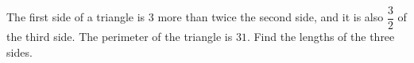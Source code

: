The first side of a triangle is $3$ more than twice the second side, and it is also $\dfrac{3}{2}$ of the third side. The perimeter of the triangle is $31$. Find the lengths of the three sides.
